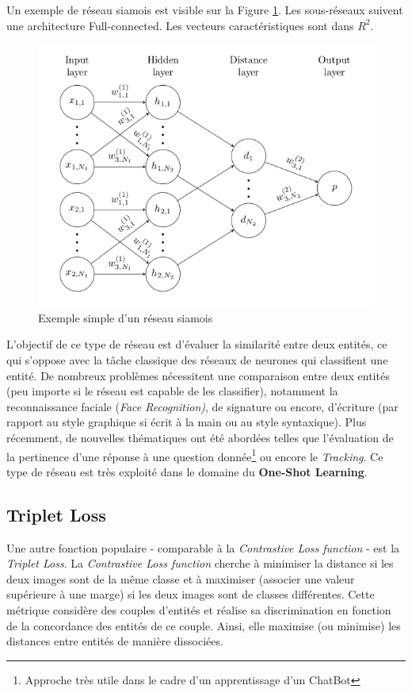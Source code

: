 \noindent Un exemple de réseau siamois est visible sur la Figure \ref{siamfig}. Les sous-réseaux suivent une architecture Full-connected. Les vecteurs caractéristiques sont dans $R^2$.\\

\begin{figure}
    \centering
    \includegraphics[scale=0.3]{./tex/siamese-network/siamepic.png}
    \caption{Exemple simple d'un réseau siamois}
    \label{siamfig}
\end{figure}

\noindent L'objectif de ce type de réseau est d'évaluer la similarité entre deux entités, ce qui s'oppose avec la tâche classique des réseaux de neurones qui classifient une entité. De nombreux problèmes nécessitent une comparaison entre deux entités (peu importe si le réseau est capable de les classifier), notamment la reconnaissance faciale (\textit{Face Recognition)}, de signature ou encore, d'écriture (par rapport au style graphique si écrit à la main ou au style syntaxique). Plus récemment, de nouvelles thématiques ont été abordées telles que l'évaluation de la pertinence d'une réponse à une question donnée\footnote{Approche très utile dans le cadre d'un apprentissage d'un ChatBot} ou encore le \textit{Tracking}. Ce type de réseau est très exploité dans le domaine du \textbf{One-Shot Learning}.\\

\subsection{Triplet Loss}
\label{tripletloss}
Une autre fonction populaire - comparable à la \textit{Contrastive Loss function} - est la \textit{Triplet Loss}\cite{tripletloss}. La \textit{Contrastive Loss function} cherche à minimiser la distance si les deux images sont de la même classe et à maximiser (associer une valeur supérieure à une marge) si les deux images sont de classes différentes. Cette métrique considère des couples d'entités et réalise sa discrimination en fonction de la concordance des entités de ce couple. Ainsi, elle maximise (ou minimise) les distances entre entités de manière dissociées.\\


